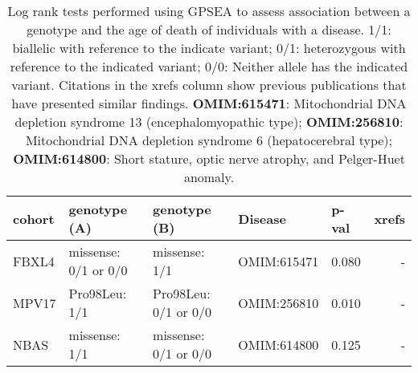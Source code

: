 \clearpage
\newpage


\begin{table}
\centering
\begin{tabular}{lp{3.5cm}p{3.5cm}>{\raggedright}p{3cm}lr}
\toprule
\textbf{cohort} & \textbf{genotype (A)} & \textbf{genotype (B)} & \textbf{Disease} & \textbf{p-val} & \textbf{xrefs}\\
\midrule
FBXL4 & missense: 0/1 or 0/0 & missense: 1/1 & OMIM:615471 & 0.080 & -\\
MPV17 & Pro98Leu: 1/1 & Pro98Leu: 0/1 or 0/0 & OMIM:256810 & 0.010 & -\\
NBAS & missense: 1/1 & missense: 0/1 or 0/0 & OMIM:614800 & 0.125 & -\\
\bottomrule
\end{tabular}
\caption{Log rank tests performed using GPSEA to assess association between a genotype and the age of
    death of individuals with a disease. 1/1: biallelic with reference to the indicate variant; 
    0/1: heterozygous with reference to the indicated variant; 0/0: Neither allele has the indicated variant.
    Citations in the xrefs column show previous publications that have presented similar findings.
    \textbf{OMIM:615471}: Mitochondrial DNA depletion syndrome 13 (encephalomyopathic type);
	\textbf{OMIM:256810}: Mitochondrial DNA depletion syndrome 6 (hepatocerebral type);
	\textbf{OMIM:614800}: Short stature, optic nerve atrophy, and Pelger-Huet anomaly.
    }
\label{tab:mortality}
\end{table}
\clearpage
\newpage



